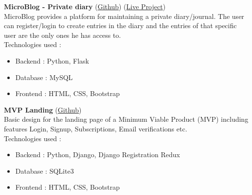\documentclass[margin]{res}
\begin{document}
\begin{resume}
   {\textbf{MicroBlog - Private diary}} (\href{https://github.com/gauravkulkarni96/MicroBlog}{Github}) (\href{https://microblog96.herokuapp.com}{Live Project})\\
    MicroBlog provides a platform for maintaining a private diary/journal. The user can register/login to create entries in the diary and the entries of that specific user are the only ones he has access to.\\
Technologies used :
    \begin{itemize} \itemsep -2pt
     \item Backend : Python, Flask
     \item Database : MySQL
     \item Frontend : HTML, CSS, Bootstrap
     \end{itemize}

   {\textbf{MVP Landing}} (\href{https://github.com/gauravkulkarni96/sample-django-project}{Github})\\
    Basic design for the landing page of a Minimum Viable Product (MVP) including features Login, Signup, Subscriptions, Email verifications etc.\\
Technologies used :
    \begin{itemize} \itemsep -2pt
     \item Backend : Python, Django, Django Registration Redux
     \item Database : SQLite3
     \item Frontend : HTML, CSS, Bootstrap
     \end{itemize}


\end{resume}
\end{document}
